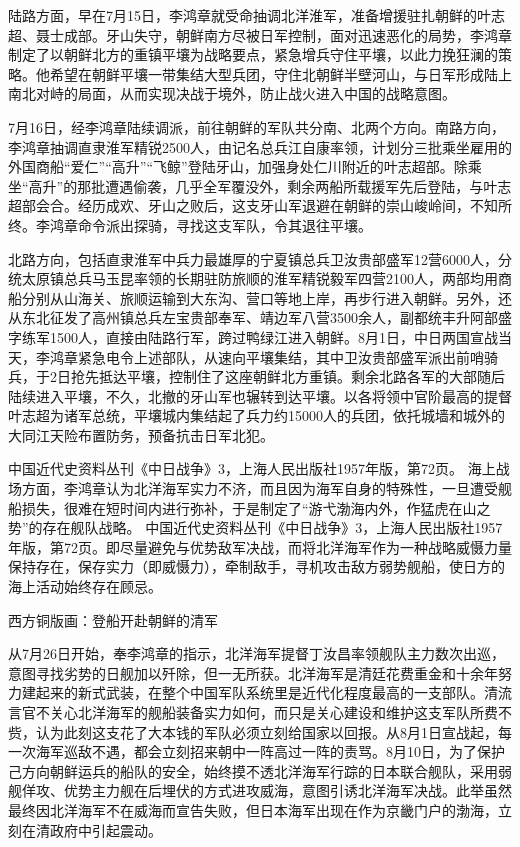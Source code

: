 \documentclass[12pt,UTF8]{ctexbook}
\begin{document}
陆路方面，早在7月15日，李鸿章就受命抽调北洋淮军，准备增援驻扎朝鲜的叶志超、聂士成部。牙山失守，朝鲜南方尽被日军控制，面对迅速恶化的局势，李鸿章制定了以朝鲜北方的重镇平壤为战略要点，紧急增兵守住平壤，以此力挽狂澜的策略。他希望在朝鲜平壤一带集结大型兵团，守住北朝鲜半壁河山，与日军形成陆上南北对峙的局面，从而实现决战于境外，防止战火进入中国的战略意图。

7月16日，经李鸿章陆续调派，前往朝鲜的军队共分南、北两个方向。南路方向，李鸿章抽调直隶淮军精锐2500人，由记名总兵江自康率领，计划分三批乘坐雇用的外国商船“爱仁”“高升”“飞鲸”登陆牙山，加强身处仁川附近的叶志超部。除乘坐“高升”的那批遭遇偷袭，几乎全军覆没外，剩余两船所载援军先后登陆，与叶志超部会合。经历成欢、牙山之败后，这支牙山军退避在朝鲜的崇山峻岭间，不知所终。李鸿章命令派出探骑，寻找这支军队，令其退往平壤。

北路方向，包括直隶淮军中兵力最雄厚的宁夏镇总兵卫汝贵部盛军12营6000人，分统太原镇总兵马玉昆率领的长期驻防旅顺的淮军精锐毅军四营2100人，两部均用商船分别从山海关、旅顺运输到大东沟、营口等地上岸，再步行进入朝鲜。另外，还从东北征发了高州镇总兵左宝贵部奉军、靖边军八营3500余人，副都统丰升阿部盛字练军1500人，直接由陆路行军，跨过鸭绿江进入朝鲜。8月1日，中日两国宣战当天，李鸿章紧急电令上述部队，从速向平壤集结，其中卫汝贵部盛军派出前哨骑兵，于2日抢先抵达平壤，控制住了这座朝鲜北方重镇。剩余北路各军的大部随后陆续进入平壤，不久，北撤的牙山军也辗转到达平壤。以各将领中官阶最高的提督叶志超为诸军总统，平壤城内集结起了兵力约15000人的兵团，依托城墙和城外的大同江天险布置防务，预备抗击日军北犯。

中国近代史资料丛刊《中日战争》3，上海人民出版社1957年版，第72页。
海上战场方面，李鸿章认为北洋海军实力不济，而且因为海军自身的特殊性，一旦遭受舰船损失，很难在短时间内进行弥补，于是制定了“游弋渤海内外，作猛虎在山之势”的存在舰队战略。 中国近代史资料丛刊《中日战争》3，上海人民出版社1957年版，第72页。即尽量避免与优势敌军决战，而将北洋海军作为一种战略威慑力量保持存在，保存实力（即威慑力），牵制敌手，寻机攻击敌方弱势舰船，使日方的海上活动始终存在顾忌。


西方铜版画：登船开赴朝鲜的清军

从7月26日开始，奉李鸿章的指示，北洋海军提督丁汝昌率领舰队主力数次出巡，意图寻找劣势的日舰加以歼除，但一无所获。北洋海军是清廷花费重金和十余年努力建起来的新式武装，在整个中国军队系统里是近代化程度最高的一支部队。清流言官不关心北洋海军的舰船装备实力如何，而只是关心建设和维护这支军队所费不赀，认为此刻这支花了大本钱的军队必须立刻给国家以回报。从8月1日宣战起，每一次海军巡敌不遇，都会立刻招来朝中一阵高过一阵的责骂。8月10日，为了保护己方向朝鲜运兵的船队的安全，始终摸不透北洋海军行踪的日本联合舰队，采用弱舰佯攻、优势主力舰在后埋伏的方式进攻威海，意图引诱北洋海军决战。此举虽然最终因北洋海军不在威海而宣告失败，但日本海军出现在作为京畿门户的渤海，立刻在清政府中引起震动。
\end{document}
